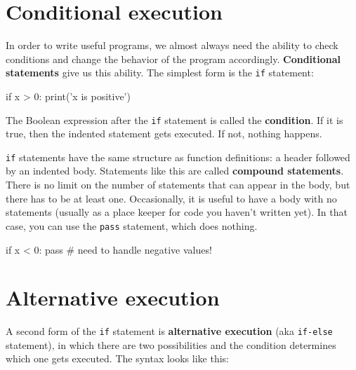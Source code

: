 \section{Conditional execution}
\label{conditional execution}


In order to write useful programs, we almost always need the ability
to check conditions and change the behavior of the program
accordingly.  {\bf Conditional statements} give us this ability.  The
simplest form is the {\tt if} statement:

\beforeverb
\begin{pycode}
if x > 0:
    print('x is positive')
\end{pycode}
\afterverb
%
The Boolean expression after the {\tt if} statement is
called the {\bf condition}.  If it is true, then the indented
statement gets executed.  If not, nothing happens.


{\tt if} statements have the same structure as function definitions:
a header followed by an indented body.  Statements like this are
called {\bf compound statements}.
%
There is no limit on the number of statements that can appear in
the body, but there has to be at least one.
Occasionally, it is useful to have a body with no statements (usually
as a place keeper for code you haven't written yet).  In that
case, you can use the {\tt pass} statement, which does nothing.


\beforeverb
\begin{pycode}
if x < 0:
    pass          # need to handle negative values!
\end{pycode}
\afterverb
%

\section{Alternative execution}
\label{alternative execution}


A second form of the {\tt if} statement is {\bf alternative execution} (aka {\tt if-else} statement),
in which there are two possibilities and the condition determines
which one gets executed.  The syntax looks like this:

